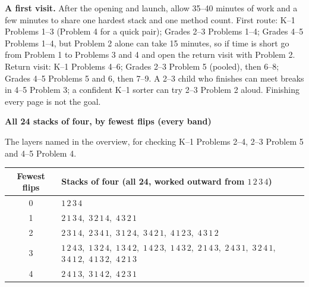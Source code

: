 \documentclass[11pt]{article}
\newcommand{\sub}[1]{\par\textbf{#1}\par}
\begin{document}
\textbf{A first visit.} After the opening and launch, allow 35--40 minutes of work and a few minutes to share one hardest stack and one method count. First route: K--1 Problems 1--3 (Problem 4 for a quick pair); Grades 2--3 Problems 1--4; Grades 4--5 Problems 1--4, but Problem 2 alone can take 15 minutes, so if time is short go from Problem 1 to Problems 3 and 4 and open the return visit with Problem 2. Return visit: K--1 Problems 4--6; Grades 2--3 Problem 5 (pooled), then 6--8; Grades 4--5 Problems 5 and 6, then 7--9. A 2--3 child who finishes can meet breaks in 4--5 Problem 3; a confident K--1 sorter can try 2--3 Problem 2 aloud. Finishing every page is not the goal.

\sub{All 24 stacks of four, by fewest flips (every band)}\label{tab:four}
The layers named in the overview, for checking K--1 Problems 2--4, 2--3 Problem 5 and 4--5 Problem 4.
\begin{center}\renewcommand{\arraystretch}{1.2}
\begin{tabular}{c l}
Fewest flips & Stacks of four (all 24, worked outward from $1\,2\,3\,4$)\\\midrule
0 & $1\,2\,3\,4$\\
1 & $2\,1\,3\,4$,\ $3\,2\,1\,4$,\ $4\,3\,2\,1$\\
2 & $2\,3\,1\,4$,\ $2\,3\,4\,1$,\ $3\,1\,2\,4$,\ $3\,4\,2\,1$,\ $4\,1\,2\,3$,\ $4\,3\,1\,2$\\
3 & $1\,2\,4\,3$,\ $1\,3\,2\,4$,\ $1\,3\,4\,2$,\ $1\,4\,2\,3$,\ $1\,4\,3\,2$,\ $2\,1\,4\,3$,\ $2\,4\,3\,1$,\ $3\,2\,4\,1$,\ $3\,4\,1\,2$,\ $4\,1\,3\,2$,\ $4\,2\,1\,3$\\
4 & $2\,4\,1\,3$,\ $3\,1\,4\,2$,\ $4\,2\,3\,1$
\end{tabular}\end{center}


\end{document}
